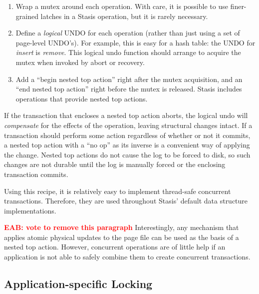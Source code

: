 \documentclass[letterpaper,twocolumn,10pt]{article}
\newcommand{\yad}{Stasis\xspace}
\newcommand{\yads}{Stasis'\xspace}
\newcommand{\eab}[1]{\textcolor{red}{\bf EAB: #1}}
\begin{document}
\begin{enumerate}
\item Wrap a mutex around each operation.  With care, it is possible 
  to use finer-grained latches in a \yad operation, but it is rarely necessary.
\item Define a {\em logical} UNDO for each operation (rather than just
  using a set of page-level UNDO's).  For example, this is easy for a
  hash table: the UNDO for {\em insert} is {\em remove}.  This logical
  undo function should arrange to acquire the mutex when invoked by
  abort or recovery.
\item Add a ``begin nested top action'' right after the mutex
  acquisition, and an ``end nested top action'' right before the mutex
  is released.  \yad includes operations that provide nested top
  actions.
\end{enumerate}

If the transaction that encloses a nested top action aborts, the
logical undo will {\em compensate} for the effects of the operation,
leaving structural changes intact.  If a transaction should perform
some action regardless of whether or not it commits, a nested top
action with a ``no op'' as its inverse is a convenient way of applying
the change.  Nested top actions do not cause the log to be forced to
disk, so such changes are not durable until the log is manually forced
or the enclosing transaction commits.

Using this recipe, it is relatively easy to implement thread-safe
concurrent transactions.  Therefore, they are used throughout \yads
default data structure implementations.

\eab{vote to remove this paragraph} 
Interestingly, any mechanism that applies atomic physical updates to
the page file can be used as the basis of a nested top action.
However, concurrent operations are of little help if an application is
not able to safely combine them to create concurrent transactions.

\subsection{Application-specific Locking}
\end{document}

